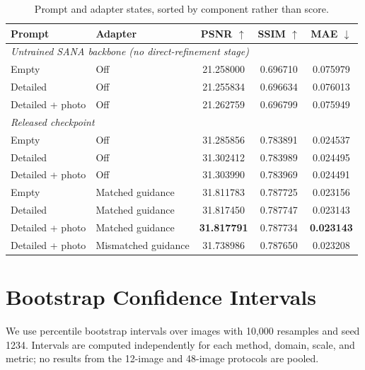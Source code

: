 \documentclass[10pt]{article}
\begin{document}
\begin{table}[H]
  \centering
  \caption{Prompt and adapter states, sorted by component rather than score.}
  \label{tab:full_ablation}
  \small
  \begin{tabular}{llccc}
    \toprule
    Prompt & Adapter & PSNR $\uparrow$ & SSIM $\uparrow$ & MAE $\downarrow$\\
    \midrule
    \multicolumn{5}{l}{\emph{Untrained SANA backbone (no direct-refinement stage)}}\\
    Empty & Off & 21.258000 & 0.696710 & 0.075979\\
    Detailed & Off & 21.255834 & 0.696634 & 0.076013\\
    Detailed + photo & Off & 21.262759 & 0.696799 & 0.075949\\
    \midrule
    \multicolumn{5}{l}{\emph{Released checkpoint}}\\
    Empty & Off & 31.285856 & 0.783891 & 0.024537\\
    Detailed & Off & 31.302412 & 0.783989 & 0.024495\\
    Detailed + photo & Off & 31.303990 & 0.783969 & 0.024491\\
    Empty & Matched guidance & 31.811783 & 0.787725 & 0.023156\\
    Detailed & Matched guidance & 31.817450 & 0.787747 & 0.023143\\
    Detailed + photo & Matched guidance & \textbf{31.817791} & 0.787734 & \textbf{0.023143}\\
    Detailed + photo & Mismatched guidance & 31.738986 & 0.787650 & 0.023208\\
    \bottomrule
  \end{tabular}
\end{table}

\section{Bootstrap Confidence Intervals}
\label{app:bootstrap}

We use percentile bootstrap intervals over images with 10,000 resamples and
seed 1234. Intervals are computed independently for each method, domain, scale,
and metric; no results from the 12-image and 48-image protocols are pooled.
\end{document}
